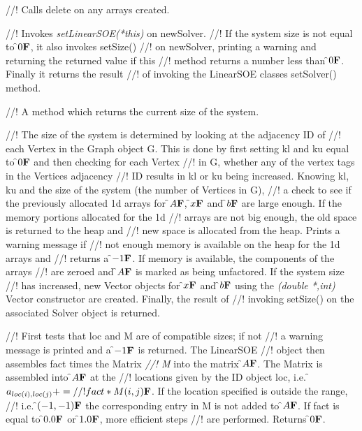 //! Calls delete on any arrays created.

//! Invokes {\em setLinearSOE(*this)} on \p newSolver.
//! If the system size is not equal to \f$0{\bf F}$, it also invokes setSize()
//! on \p newSolver, printing a warning and returning the returned value if this
//! method returns a number less than \f$0{\bf F}$. Finally it returns the result
//! of invoking the LinearSOE classes setSolver() method.

//! A method which returns the current size of the system.

//! The size of the system is determined by looking at the adjacency ID of
//! each Vertex in the Graph object \p G. This is done by first setting
\p kl and \p ku equal to \f$0{\bf F}$ and then checking for each Vertex
//! in \p G, whether any of the vertex tags in the Vertices adjacency
//! ID results in \p kl or \p ku being increased. Knowing \p kl,
\p ku and the size of the system (the number of Vertices in \p G),
//! a check to see if the previously allocated 1d arrays for \f$A{\bf F}$, \f$x{\bf F}$ and
\f$b{\bf F}$ are large enough. If the memory portions allocated for the 1d
//! arrays are not big enough, the old space is returned to the heap and
//! new space is allocated from the heap. Prints a warning message if
//! not enough memory is available on the heap for the 1d arrays and
//! returns a \f$-1{\bf F}$. If memory is available, the components of the arrays
//! are zeroed and \f$A{\bf F}$ is marked as being unfactored. If the system size
//! has increased, new Vector objects for \f$x{\bf F}$ and \f$b{\bf F}$ using the {\em (double
*,int)} Vector constructor are created. Finally, the result of
//! invoking setSize() on the associated Solver object is returned.


//! First tests that \p loc and \p M are of compatible sizes; if not
//! a warning message is printed and a \f$-1{\bf F}$ is returned. The LinearSOE
//! object then assembles \p fact times the Matrix {\em 
//! M} into the matrix \f$A{\bf F}$. The Matrix is assembled into \f$A{\bf F}$ at the
//! locations given by the ID object \p loc, i.e. \f$a_{loc(i),loc(j)} +=
//! fact * M(i,j){\bf F}$. If the location specified is outside the range,
//! i.e. \f$(-1,-1){\bf F}$ the corresponding entry in \p M is not added to
\f$A{\bf F}$. If \p fact is equal to \f$0.0{\bf F}$ or \f$1.0{\bf F}$, more efficient steps
//! are performed. Returns \f$0{\bf F}$.


